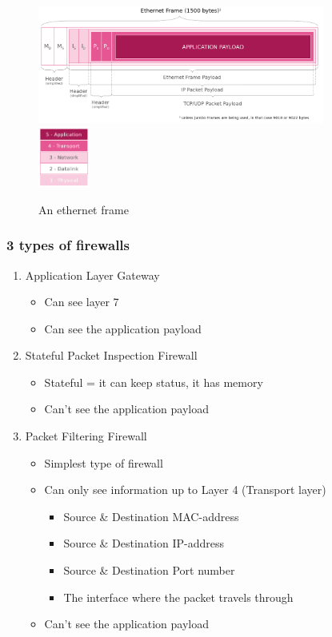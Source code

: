 \documentclass{article}
\begin{document}
\begin{figure}[H]
    \centering
    \includegraphics[width=0.84\textwidth]{tcp-ip2.png}
    \includegraphics[width=0.15\textwidth]{tcp-ip3.png}
    \caption{An ethernet frame}
\end{figure}

\subsubsection{3 types of firewalls}

\begin{enumerate}
    \item Application Layer Gateway
    \begin{itemize}
        \item Can see layer 7
        \item Can see the application payload
    \end{itemize}
    \item Stateful Packet Inspection Firewall
    \begin{itemize}
        \item Stateful = it can keep status, it has memory
        \item Can't see the application payload
    \end{itemize}
    \item Packet Filtering Firewall
    \begin{itemize}
        \item Simplest type of firewall
        \item Can only see information up to Layer 4 (Transport layer)
        \begin{itemize}
            \item Source \& Destination MAC-address
            \item Source \& Destination IP-address
            \item Source \& Destination Port number
            \item The interface where the packet travels through
        \end{itemize}
        \item Can't see the application payload
    \end{itemize}
\end{enumerate}
\end{document}
